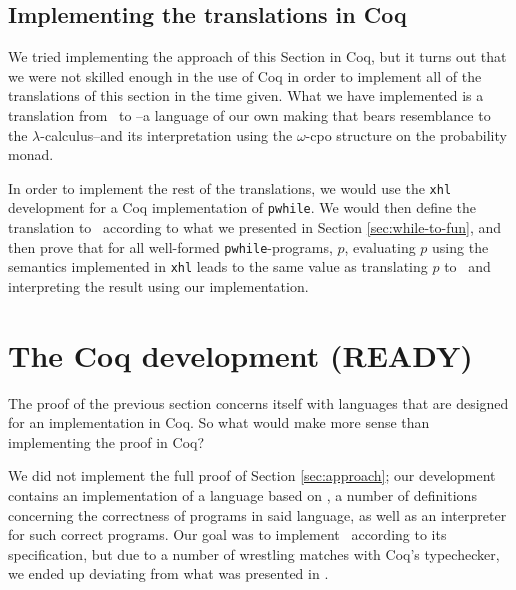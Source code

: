 \documentclass[11pt, leqno, titlepage]{article}
\theoremstyle{definition}
\begin{document}
\subsection{Implementing the translations in Coq}
\label{sec:howto-coq}
We tried implementing the approach of this Section in Coq, but it turns out that we
were not skilled enough in the use of Coq in order to implement all of the
translations of this section in the time given. What we have implemented is a
translation from \rml\ to \srml --a language of our own making that bears resemblance
to the $\lambda$-calculus--and its interpretation using the $\omega$-cpo structure on
the probability monad. 

In order to implement the rest of the translations, we would use the \texttt{xhl}
development for a Coq implementation of \texttt{pwhile}. We would then define the
translation to \rml\ according to what we presented in Section
\ref{sec:while-to-fun}, and then prove that for all well-formed
\texttt{pwhile}-programs, $p$, evaluating $p$ using the semantics implemented in
\texttt{xhl} leads to the same value as translating $p$ to \rml\ and interpreting the
result using our implementation. 




\section{The Coq development (READY)}\label{sec:contrib}
The proof of the previous section concerns itself with languages that are designed
for an implementation in Coq. So what would make more sense than implementing the
proof in Coq?

We did not implement the full proof of Section \ref{sec:approach}; our development
contains an implementation of a language based on \rml, a number of definitions
concerning the correctness of programs in said language, as well as an interpreter
for such correct programs. Our goal was to implement \rml\ according to its
specification, but due to a number of wrestling matches with Coq's typechecker, we
ended up deviating from what was presented in \cite{rml-paper}.
\end{document}
